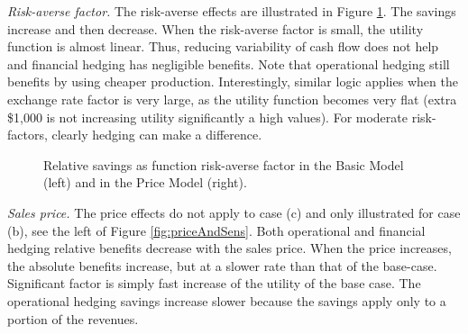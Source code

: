 \documentclass[mnsc,nonblindrev,copyedit]{informs2_wz} %
\newcommand{\OUT}[1]{}
\begin{document}
{\noindent \em Risk-averse factor.} The risk-averse effects are illustrated in Figure \ref{fig:risk}.  The savings increase and then decrease.  When the risk-averse factor is small, the utility function is almost linear.  Thus, reducing variability of cash flow does not help and financial hedging has negligible benefits.  Note that operational hedging still benefits by using cheaper production.  Interestingly, similar logic applies when the exchange rate factor is very large, as the utility function becomes very flat (extra \$1,000 is not increasing utility significantly a high values).  For moderate risk-factors, clearly hedging can make a difference.  \begin{figure}[ht]
\begin{center}
\begin{minipage}{6in}
    \begin{minipage}{3.1in}
        \epsfxsize=2.8in
   \hspace{-0.0in}     
    \end{minipage}
    \begin{minipage}{2.8in}
        \epsfxsize=2.8in
   \hspace{-0.0in}     
    \end{minipage}
\end{minipage}
\vspace{.05in} \caption{Relative savings as function risk-averse factor in the Basic Model (left) and  in the Price Model (right).}
\label{fig:risk} \vspace{-.2in}
\end{center}
\end{figure}



{\noindent \em Sales price.} The price effects do not apply to case (c) and only illustrated for case (b), see the left of Figure \ref{fig:priceAndSens}.  Both operational and financial hedging relative benefits decrease with the sales price.  When the price increases, the absolute benefits increase, but at a slower rate than that of the base-case.  Significant factor is simply fast increase of the utility of the base case.  \OUT{Additionally, for financial hedging, this is due to the convexity of utility function's derivative.  Note that financial hedging's role is to bring utilities closer to each other under all exchange rate scenarios.  Let us consider two cash-flow scenarios.  Since cash flow is almost linear in price, the two cash flow can be expressed as $pC_1$ and $pC_2$ with probabilities $q_1$ and $q_2$, respectively.  Then, the financial hedging utility is $U(p(q_1C_1+q_2C_2))$ and the base case utility $q_1U(pC_1) + q_2U(pC_2)$.  When $U^\prime$ is convex (which is the case for exponential utility), the financial hedging utility increases slower than the base-case utility.}  The operational hedging savings increase slower because the savings apply only to a portion of the revenues.
\end{document}
